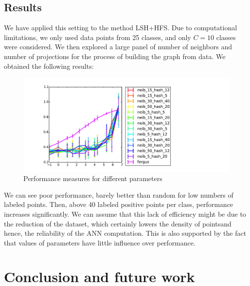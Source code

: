 \documentclass{article} %
\begin{document}
\subsection{Results}
We have applied this setting to the method LSH+HFS. Due to computational limitations, we only used data points from 25 classes, and only $C=10$ classes were considered. We then explored a large panel of number of neighbors and number of projections for the process of building the graph from data. We obtained the following results:

\begin{figure}[!h]
\hspace{-3cm}
\includegraphics[width=1.8\textwidth]{method_comp.pdf}
\caption{Performance measures for different parameters}
\label{variation}
\end{figure}

We can see poor performance, barely better than random for low numbers of labeled points. Then, above 40 labeled positive points per class, performance increases significantly. We can assume that this lack of efficiency might be due to the reduction of the dataset, which certainly lowers the density of pointsand hence, the reliability of the ANN computation. This is also supported by the fact that values of parameters have little influence over performance.

\section{Conclusion and future work}
\end{document}
